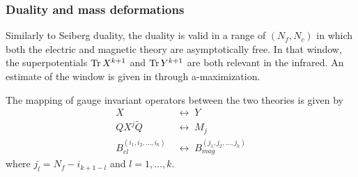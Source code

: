 \subsubsection{Duality and mass deformations}
Similarly to Seiberg duality, the duality is valid in a range of $(N_f,N_c)$ in which both the electric and magnetic theory are asymptotically free. 
In that window, the superpotentials $\mathrm{Tr } \, X^{k+1}$ and $\mathrm{Tr } \, Y^{k+1}$ are both relevant in the infrared.
An estimate of the window is given in \cite{Kutasov:2003iy} through a-maximization.  



The mapping of gauge invariant operators between the two theories is given by
\begin{equation}
\begin{aligned}
X \; & \longleftrightarrow \; Y \\
Q X^j \tilde{Q} \; & \longleftrightarrow  \; M_j \\
B^{(i_1, i_2, \dotsc, i_k)}_{el} \; & \longleftrightarrow \; B_{mag}^{(j_1, j_2 ,\dotsc, j_k) }  
\end{aligned}
\end{equation}
where $j_l = N_f - i_{k+1-l} $ and $ l = 1,\dotsc,k $.

